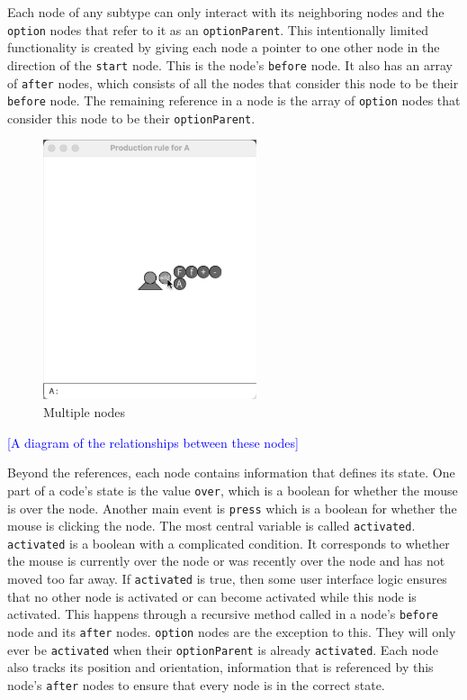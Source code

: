 \documentclass[12pt,twoside]{reedthesis}
\newcommand{\code}[1]{\texttt{#1}}
\begin{document}
	Each node of any subtype can only interact with its neighboring nodes and the \code{option} nodes that refer to it as an \code{optionParent}. This intentionally limited functionality is created by giving each node a pointer to one other node in the direction of the \code{start} node. This is the node's \code{before} node. It also has an array of \code{after} nodes, which consists of all the nodes that consider this node to be their \code{before} node. The remaining reference in a node is the array of \code{option} nodes that consider this node to be their \code{optionParent}.
	
	
	\begin{figure}[h]
	\centering
	\includegraphics[height = 3in]{Images/HowItWorks4D}
	\caption{Multiple nodes}
	\label {HowItWorks4D}
	\end{figure}
	
	\textcolor{blue}{[A diagram of the relationships between these nodes]}
	
	
	
	Beyond the references, each node contains information that defines its state. One part of a code's state is the value \code{over}, which is a boolean for whether the mouse is over the node. Another main event is \code{press} which is a boolean for whether the mouse is clicking the node. The most central variable is called \code{activated}. \code{activated} is a boolean with a complicated condition. It corresponds to whether the mouse is currently over the node or was recently over the node and has not moved too far away. If \code{activated} is true, then some user interface logic ensures that no other node is activated or can become activated while this node is activated. This happens through a recursive method called in a node's \code{before} node and its \code{after} nodes. \code{option} nodes are the exception to this. They will only ever be \code{activated} when their \code{optionParent} is already \code{activated}. Each node also tracks its position and orientation, information that is referenced by this node's \code{after} nodes to ensure that every node is in the correct state.\\
	
\end{document}
